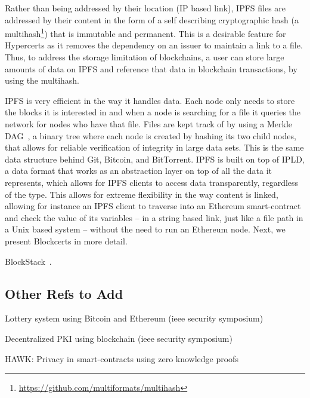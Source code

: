 Rather than being addressed by their location (IP based link), IPFS files are addressed by their content in the form of a self describing cryptographic hash (a multihash\footnote{\url{https://github.com/multiformats/multihash}}) that is immutable and permanent. This is a desirable feature for Hypercerts as it removes the dependency on an issuer to maintain a link to a file. Thus, to address the storage limitation of blockchains, a user can store large amounts of data on IPFS and reference that data in blockchain transactions, by using the multihash.

IPFS is very efficient in the way it handles data. Each node only needs to store the blocks it is interested in and when a node is searching for a file it queries the network for nodes who have that file. Files are kept track of by using a Merkle DAG~\cite{Merkle:1987jk}, a binary tree where each node is created by hashing its two child nodes, that allows for reliable verification of integrity in large data sets. This is the same data structure behind Git, Bitcoin, and BitTorrent. IPFS is built on top of IPLD, a data format that works as an abstraction layer on top of all the data it represents, which allows for IPFS clients to access data transparently, regardless of the type. This allows for extreme flexibility in the way content is linked, allowing for instance an IPFS client to traverse into an Ethereum smart-contract and check the value of its variables -- in a string based link, just like a file path in a Unix based system -- without the need to run an Ethereum node. Next, we present Blockcerts in more detail.

BlockStack~\cite{blockstack}.

\subsection{Other Refs to Add}
Lottery system using Bitcoin and Ethereum (ieee security symposium) \cite{Miller:2017cf}

Decentralized PKI using blockchain (ieee security symposium) \cite{Anonymous:umr1kkOC}

HAWK: Privacy in smart-contracts using zero knowledge proofs \cite{Kosba:2016iq}




